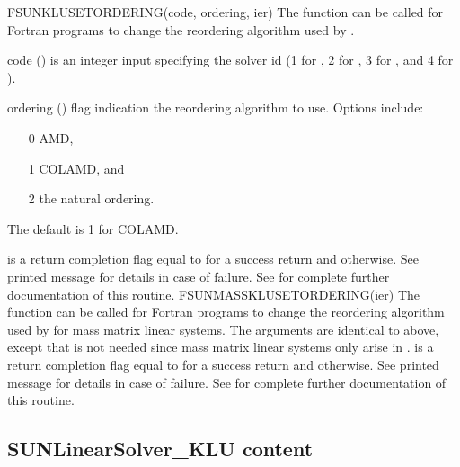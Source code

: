 {
  FSUNKLUSETORDERING(code, ordering, ier)
}
{
  The function  can be called for Fortran programs
  to change the reordering algorithm used by {\klu}.
}
{
  \begin{args}[ordering]
  \item[code] ()
    is an integer input specifying the solver id (1 for {\cvode}, 2
    for {\ida}, 3 for {\kinsol}, and 4 for {\arkode}).
  \item[ordering] ()
    flag indication the reordering algorithm to use.  Options include:
    \begin{itemize}
    \item[0] AMD,
    \item[1] COLAMD, and
    \item[2] the natural ordering.
    \end{itemize}
    The default is 1 for COLAMD.
  \end{args}
}
{
   is a  return completion flag equal to  for a success
  return and  otherwise. See printed message for details in case
  of failure.
}
{
  See  for complete further documentation of
  this routine.
}
%
%
{
  FSUNMASSKLUSETORDERING(ier)
}
{
  The function  can be called for Fortran programs
  to change the reordering algorithm used by {\klu} for mass matrix linear systems.
}
{
  The arguments are identical to  above, except that
   is not needed since mass matrix linear systems only arise
  in {\arkode}.
}
{
   is a  return completion flag equal to  for a success
  return and  otherwise. See printed message for details in case
  of failure.
}
{
  See  for complete further documentation of
  this routine.
}


\subsection{SUNLinearSolver\_KLU content}
\label{ss:sunlinsol_klu_content}

